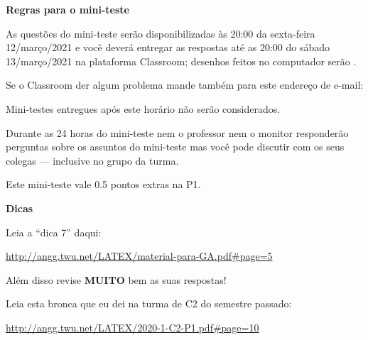 \documentclass[oneside,12pt]{article}
\begin{document}
\newpage

%

{\bf Regras para o mini-teste}


As questões do mini-teste serão disponibilizadas às 20:00 da
sexta-feira 12/março/2021 e você deverá entregar as respostas
 até as 20:00 do sábado 13/março/2021 na
plataforma Classroom; desenhos feitos no computador serão
.

Se o Classroom der algum problema mande também para este endereço de
e-mail:

\ssk


\ssk

Mini-testes entregues após este horário não serão considerados.

Durante as 24 horas do mini-teste nem o professor nem o monitor
responderão perguntas sobre os assuntos do mini-teste mas você pode
discutir com os seus colegas --- inclusive no grupo da turma.

Este mini-teste vale 0.5 pontos extras na P1.


\newpage


{\bf Dicas}

\ssk

Leia a ``dica 7'' daqui:

\ssk

\url{http://angg.twu.net/LATEX/material-para-GA.pdf\#page=5}

\bsk

Além disso revise {\bf MUITO} bem as suas respostas!

Leia esta bronca que eu dei na turma de C2 do semestre passado:

\ssk

\url{http://angg.twu.net/LATEX/2020-1-C2-P1.pdf\#page=10}
\end{document}
